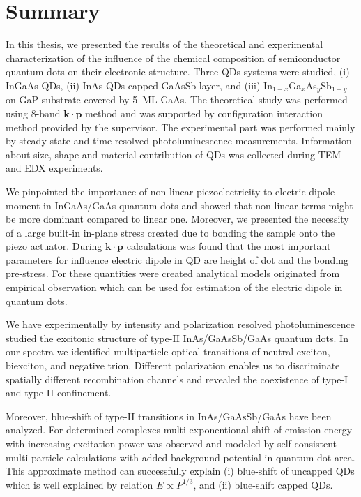
\chapter{Summary}\label{chap:summary}

In this thesis, we presented the results of the theoretical and experimental characterization of the influence of the chemical composition of semiconductor quantum dots on their electronic structure. Three QDs systems were studied, (i) InGaAs QDs, (ii) InAs QDs capped GaAsSb layer, and (iii) In$_{1-x}$Ga$_x$As$_y$Sb$_{1-y}$ on GaP substrate covered by 5~ML GaAs. The theoretical study was performed using 8-band $\mathbf{k\cdot p}$ method and was supported by configuration interaction method provided by the supervisor. The experimental part was performed mainly by steady-state and time-resolved photoluminescence measurements. Information about size, shape and material contribution of QDs was collected during TEM and EDX experiments.

We pinpointed the importance of non-linear piezoelectricity to electric dipole moment in InGaAs/GaAs quantum dots and showed that non-linear terms might be more dominant compared to linear one. Moreover, we presented the necessity of a large built-in in-plane stress created due to bonding the sample onto the piezo actuator. During $\mathbf{k\cdot p}$ calculations was found that the most important parameters for influence electric dipole in QD are height of dot and the bonding pre-stress. For these quantities were created analytical models originated from empirical observation which can be used for estimation of the electric dipole in quantum dots.

We have experimentally by intensity and polarization resolved photoluminescence studied the excitonic structure of type-II InAs/GaAsSb/GaAs quantum dots. In our spectra we identified multiparticle optical transitions of neutral exciton, biexciton, and negative trion. Different polarization enables us to discriminate spatially different recombination channels and revealed the coexistence of type-I and type-II confinement.

Moreover, blue-shift of type-II transitions in InAs/GaAsSb/GaAs have been analyzed. For determined complexes multi-exponentional shift of emission energy with increasing excitation power was observed and modeled by self-consistent multi-particle calculations with added background potential in quantum dot area. This approximate method can successfully explain (i) blue-shift of uncapped QDs which is well explained by relation $E\propto P^{1/3}$, and (ii) blue-shift capped QDs.


\newpage

\newpage 